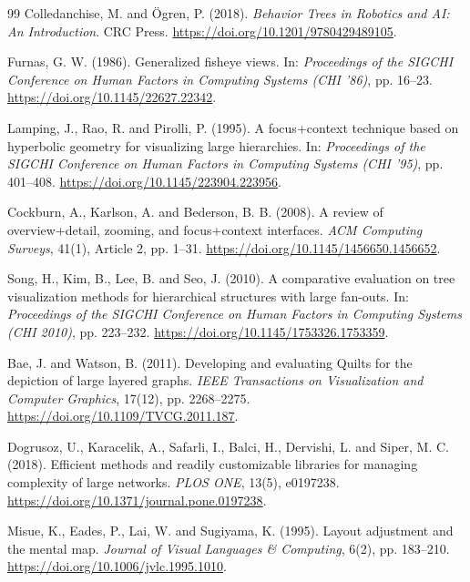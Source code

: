 \begin{thebibliography}{99}
Colledanchise, M. and Ögren, P. (2018). \emph{Behavior Trees in Robotics and AI: An Introduction}. CRC Press. \url{https://doi.org/10.1201/9780429489105}.

Furnas, G. W. (1986). Generalized fisheye views. In: \emph{Proceedings of the SIGCHI Conference on Human Factors in Computing Systems (CHI '86)}, pp. 16--23. \url{https://doi.org/10.1145/22627.22342}.

Lamping, J., Rao, R. and Pirolli, P. (1995). A focus+context technique based on hyperbolic geometry for visualizing large hierarchies. In: \emph{Proceedings of the SIGCHI Conference on Human Factors in Computing Systems (CHI '95)}, pp. 401--408. \url{https://doi.org/10.1145/223904.223956}.

Cockburn, A., Karlson, A. and Bederson, B. B. (2008). A review of overview+detail, zooming, and focus+context interfaces. \emph{ACM Computing Surveys}, 41(1), Article 2, pp. 1--31. \url{https://doi.org/10.1145/1456650.1456652}.

Song, H., Kim, B., Lee, B. and Seo, J. (2010). A comparative evaluation on tree visualization methods for hierarchical structures with large fan-outs. In: \emph{Proceedings of the SIGCHI Conference on Human Factors in Computing Systems (CHI 2010)}, pp. 223--232. \url{https://doi.org/10.1145/1753326.1753359}.

Bae, J. and Watson, B. (2011). Developing and evaluating Quilts for the depiction of large layered graphs. \emph{IEEE Transactions on Visualization and Computer Graphics}, 17(12), pp. 2268--2275. \url{https://doi.org/10.1109/TVCG.2011.187}.

Dogrusoz, U., Karacelik, A., Safarli, I., Balci, H., Dervishi, L. and Siper, M. C. (2018). Efficient methods and readily customizable libraries for managing complexity of large networks. \emph{PLOS ONE}, 13(5), e0197238. \url{https://doi.org/10.1371/journal.pone.0197238}.

Misue, K., Eades, P., Lai, W. and Sugiyama, K. (1995). Layout adjustment and the mental map. \emph{Journal of Visual Languages \& Computing}, 6(2), pp. 183--210. \url{https://doi.org/10.1006/jvlc.1995.1010}.


\end{thebibliography}
